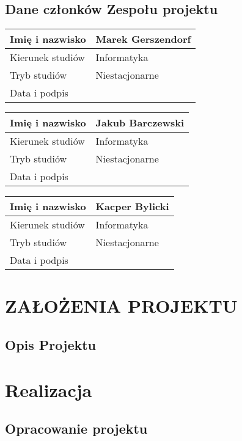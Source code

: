 \documentclass[12pt, oneside, a4paper]{book}
\begin{document}
\section{Dane członków Zespołu projektu}

\begin{tabular}{ |p{5cm}|p{7cm}|}
    \hline
    Imię i nazwisko & Marek Gerszendorf \\
    \hline
    Kierunek studiów & Informatyka\\
    \hline
    Tryb studiów & Niestacjonarne\\
    \hline
    Data i podpis & \\ \hline
\end{tabular}

\bigskip
\noindent
\begin{tabular}{ |p{5cm}|p{7cm}|}
    \hline
    Imię i nazwisko & Jakub Barczewski\\
    \hline
    Kierunek studiów & Informatyka\\
    \hline
    Tryb studiów & Niestacjonarne\\
    \hline
    Data i podpis & \\ \hline
\end{tabular}

\bigskip
\noindent
\begin{tabular}{ |p{5cm}|p{7cm}|}
    \hline
    Imię i nazwisko & Kacper Bylicki\\
    \hline
    Kierunek studiów & Informatyka\\
    \hline
    Tryb studiów & Niestacjonarne\\
    \hline
    Data i podpis & \\ \hline
\end{tabular}

\chapter{\MakeUppercase{Założenia projektu}}

\section{Opis Projektu}

\chapter{Realizacja}

\section{Opracowanie projektu}
\end{document}
